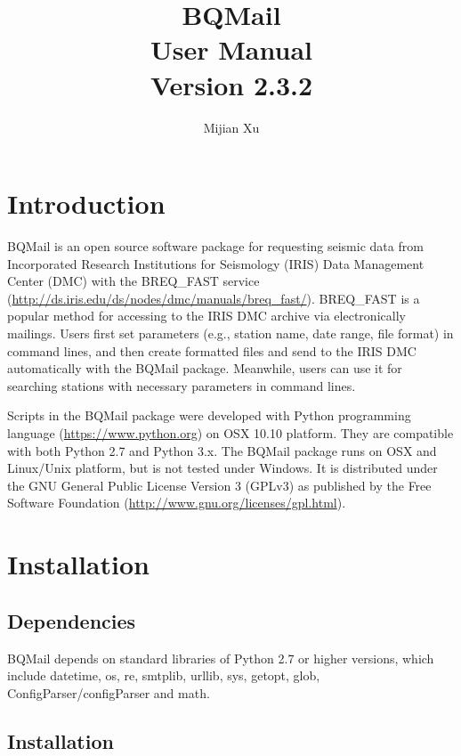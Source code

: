 \documentclass[12pt, a4paper]{report}
\title{BQMail\\User Manual\\Version 2.3.2}
\author[1,*]{Mijian Xu}
\affil[1]{\small School of Earth Science and Engineering, Nanjing University}
\affil[*]{\small Email: gomijianxu@gmail.com}
\begin{document}
\maketitle
\tableofcontents

\chapter{Introduction}

BQMail is an open source software package for requesting seismic data from Incorporated Research Institutions for Seismology (IRIS) Data Management Center (DMC) with the BREQ\_FAST service (\url{http://ds.iris.edu/ds/nodes/dmc/manuals/breq_fast/}). BREQ\_FAST is a popular method for accessing to the IRIS DMC archive via electronically mailings. Users first set parameters (e.g., station name, date range, file format) in command lines, and then create formatted files and send to the IRIS DMC automatically with the BQMail package. Meanwhile, users can use it for searching stations with necessary parameters in command lines.

Scripts in the BQMail package were developed with Python programming language (\url{https://www.python.org}) on OSX 10.10 platform. They are compatible with both Python 2.7 and Python 3.x. The BQMail package runs on OSX and Linux/Unix platform, but is not tested under Windows. It is distributed under the GNU General Public License Version 3 (GPLv3) as published by the Free Software Foundation (\url{http://www.gnu.org/licenses/gpl.html}).

\chapter{Installation}

\section{Dependencies}
BQMail depends on standard libraries of Python 2.7 or higher versions, which include datetime, os, re, smtplib, urllib, sys, getopt, glob, ConfigParser/configParser and math.

\section{Installation}
\end{document}
